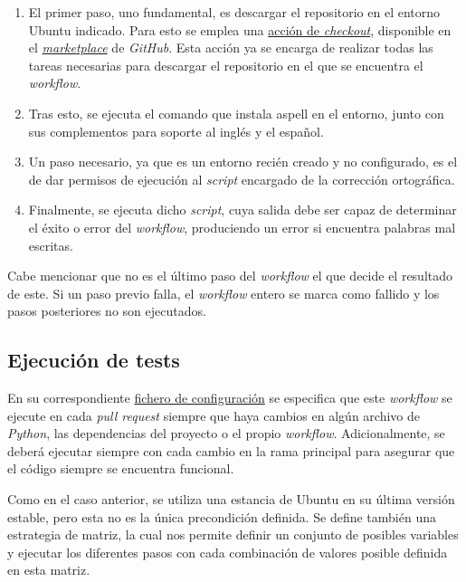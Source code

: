 \begin{enumerate}
    \item El primer paso, uno fundamental, es descargar el repositorio en el entorno Ubuntu indicado. Para esto se emplea una \href{https://github.com/marketplace/actions/checkout}{acción de \textit{checkout}}, disponible en el \href{https://github.com/marketplace?type=actions}{\textit{marketplace}} de \textit{GitHub}. Esta acción ya se encarga de realizar todas las tareas necesarias para descargar el repositorio en el que se encuentra el \textit{workflow}.
    \item Tras esto, se ejecuta el comando que instala aspell en el entorno, junto con sus complementos para soporte al inglés y el español.
    \item Un paso necesario, ya que es un entorno recién creado y no configurado, es el de dar permisos de ejecución al \textit{script} encargado de la corrección ortográfica.
    \item Finalmente, se ejecuta dicho \textit{script}, cuya salida debe ser capaz de determinar el éxito o error del \textit{workflow}, produciendo un error si encuentra palabras mal escritas.
\end{enumerate}

Cabe mencionar que no es el último paso del \textit{workflow} el que decide el resultado de este. Si un paso previo falla, el \textit{workflow} entero se marca como fallido y los pasos posteriores no son ejecutados.

\subsection{Ejecución de tests}

En su correspondiente \href{https://github.com/Anglepi/My-Many-Reads/blob/main/.github/workflows/tests.yml}{fichero de configuración} se especifica que este \textit{workflow} se ejecute en cada \textit{pull request} siempre que haya cambios en algún archivo de \textit{Python}, las dependencias del proyecto o el propio \textit{workflow}. Adicionalmente, se deberá ejecutar siempre con cada cambio en la rama principal para asegurar que el código siempre se encuentra funcional.

Como en el caso anterior, se utiliza una estancia de Ubuntu en su última versión estable, pero esta no es la única precondición definida. Se define también una estrategia de matriz, la cual nos permite definir un conjunto de posibles variables y ejecutar los diferentes pasos con cada combinación de valores posible definida en esta matriz.

